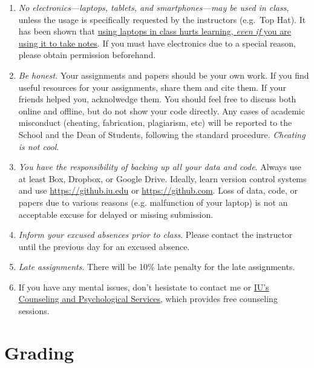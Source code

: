 \documentclass[11pt,article,oneside]{memoir} %
\begin{document}
\begin{enumerate}
\item \emph{No electronics---laptops, tablets, and smartphones---may be used in class}, unless the usage is specifically requested by the instructors (e.g.~Top Hat).  
It has been shown that \href{http://www.scientificamerican.com/article/a-learning-secret-don-t-take-notes-with-a-laptop/}{using laptops in class hurts learning, \emph{even if} you are using it to take notes}.  
If you must have electronics due to a special reason, please obtain permission beforehand. 

\item \emph{Be honest.} Your assignments and papers should be your own work.  
If you find useful resources for your assignments, share them and cite them. 
If your friends helped you, acknolwedge them. 
You should feel free to discuss both online and offline, but do not show your code directly.  
Any cases of academic misconduct (cheating, fabrication, plagiarism, etc) will be reported to the School and the Dean of Students, following the standard procedure. 
\emph{Cheating is not cool}. 

\item \emph{You have the responsibility of backing up all your data and code}.
Always use at least Box, Dropbox, or Google Drive. Ideally, learn version
control systems and use \url{https://github.iu.edu} or
\url{https://github.com}. Loss of data, code, or papers due to various reasons
(e.g. malfunction of your laptop) is not an acceptable excuse for delayed or
missing submission. 

\item \emph{Inform your excused absences prior to class}. Please contact the
instructor until the previous day for an excused absence.  

\item \emph{Late assignments}. There will be 10\% late penalty for the late assignments. 

\item If you have any mental issues, don't hesistate to contact me or
\href{http://healthcenter.indiana.edu/counseling/index.shtml}{IU's Counseling
and Psychological Services}, which provides free counseling sessions. 


\end{enumerate}%
\section{Grading}%
\label{sec:grading_tentative_}
\end{document}
